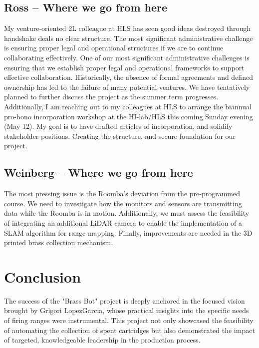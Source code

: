 \documentclass{scrarticle}
\begin{document}
\subsection{Ross -- Where we go from here}
My venture-oriented 2L colleague at HLS has seen good ideas destroyed through handshake deals no clear structure. The most significant administrative challenge is ensuring proper legal and operational structures if we are to continue collaborating effectively. One of our most significant administrative challenges is ensuring that we establish proper legal and operational frameworks to support effective collaboration. Historically, the absence of formal agreements and defined ownership has led to the failure of many potential ventures. We have tentatively planned to further discuss the project as the summer term progresses. Additionally, I am reaching out to my colleagues at HLS to arrange the biannual pro-bono incorporation workshop at the HI-lab/HLS this coming Sunday evening (May 12). My goal is to have drafted articles of incorporation, and solidify stakeholder positions.  Creating the structure, and secure foundation for our project.

\subsection{Weinberg -- Where we go from here}
The most pressing issue is the Roomba's deviation from the pre-programmed course. We need to investigate how the monitors and sensors are transmitting data while the Roomba is in motion. Additionally, we must assess the feasibility of integrating an additional LiDAR camera to enable the implementation of a SLAM algorithm for range mapping. Finally, improvements are needed in the 3D printed brass collection mechanism.
\section{Conclusion}

The success of the "Brass Bot" project is deeply anchored in the focused vision brought by Grigori LopezGarcia, whose practical insights into the specific needs of firing ranges were instrumental. This project not only showcased the feasibility of automating the collection of spent cartridges but also demonstrated the impact of targeted, knowledgeable leadership in the production process.
\end{document}

